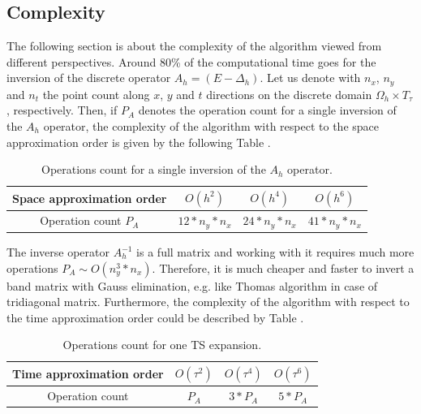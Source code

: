 \documentclass[11pt,a4paper,twoside]{article}
\begin{document}
\subsection{Complexity}
The following section is about the complexity of the algorithm viewed from different perspectives. Around 80\% of the computational time goes for the inversion of the discrete operator $A_h = (E - \Delta_h)$. Let us denote with $n_x$, $n_y$ and $n_t$ the point count along $x$, $y$ and $t$ directions on the discrete domain $\Omega_h \times T_{\tau}$, respectively. Then, if $P_A$ denotes the operation count for a single inversion of the $A_h$ operator, the complexity of the algorithm with respect to the space approximation order is given by the following Table . \begin{table}[!htbp]
\centering
		\begin{tabular}{|c|c|c|c|}
			\hline
      Space approximation order  &        $O(h^2)$    &        $O(h^4)$     &        $O(h^6)$    \\
			\hline 
      Operation count $P_A$ &        $12 * n_y * n_x$    &        $24 * n_y * n_x$     &        $41 * n_y * n_x$    \\
			\hline
		\end{tabular}
		\caption{Operations count for a single inversion of the $A_h$ operator.}

\label{tab:b}
\end{table}

The inverse operator $A_h^{-1}$ is a full matrix and working with it requires much more operations $P_A \sim O(n_y^3 * n_x)$. Therefore, it is much cheaper and faster to invert a band matrix with Gauss elimination, e.g. like Thomas algorithm in case of tridiagonal matrix. Furthermore, the complexity of the algorithm with respect to the time approximation order could be described by Table .
\begin{table}[!htbp]
\centering
		\begin{tabular}{|c|c|c|c|}
			\hline
       Time approximation order  &        $O(\tau^2)$    &        $O(\tau^4)$     &        $O(\tau^6)$    \\
			\hline 
      Operation count  &        $P_A$    &        $3 * P_A$     &        $5 * P_A$    \\
			\hline
		\end{tabular}
		\caption{Operations count for one TS expansion.}

\label{tab:c}
\end{table}
\end{document}
